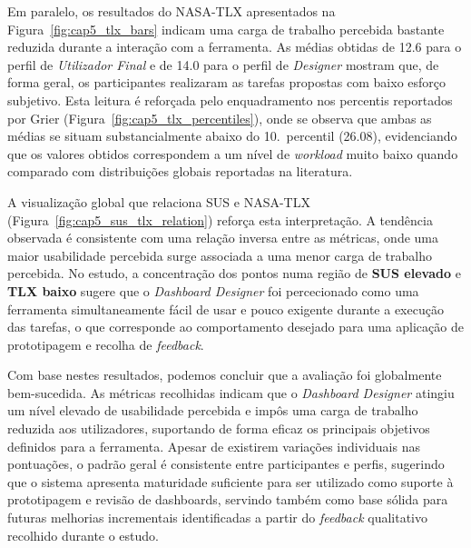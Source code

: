 Em paralelo, os resultados do NASA-TLX apresentados na Figura~\ref{fig:cap5_tlx_bars} indicam uma carga de trabalho percebida bastante reduzida durante a interação com a ferramenta. As médias obtidas de 12.6 para o perfil de \textit{Utilizador Final} e de 14.0 para o perfil de \textit{Designer} mostram que, de forma geral, os participantes realizaram as tarefas propostas com baixo esforço subjetivo. Esta leitura é reforçada pelo enquadramento nos percentis reportados por Grier (Figura~\ref{fig:cap5_tlx_percentiles}), onde se observa que ambas as médias se situam substancialmente abaixo do 10.\ percentil (26.08), evidenciando que os valores obtidos correspondem a um nível de \textit{workload} muito baixo quando comparado com distribuições globais reportadas na literatura. \cite{grier2015high}

A visualização global que relaciona SUS e NASA-TLX (Figura~\ref{fig:cap5_sus_tlx_relation}) reforça esta interpretação. A tendência observada é consistente com uma relação inversa entre as métricas, onde uma maior usabilidade percebida surge associada a uma menor carga de trabalho percebida. No estudo, a concentração dos pontos numa região de \textbf{SUS elevado} e \textbf{TLX baixo} sugere que o \textit{Dashboard Designer} foi percecionado como uma ferramenta simultaneamente fácil de usar e pouco exigente durante a execução das tarefas, o que corresponde ao comportamento desejado para uma aplicação de prototipagem e recolha de \textit{feedback}. \cite{melnick2020perceived}

Com base nestes resultados, podemos concluir que a avaliação foi globalmente bem-sucedida. As métricas recolhidas indicam que o \textit{Dashboard Designer} atingiu um nível elevado de usabilidade percebida e impôs uma carga de trabalho reduzida aos utilizadores, suportando de forma eficaz os principais objetivos definidos para a ferramenta. Apesar de existirem variações individuais nas pontuações, o padrão geral é consistente entre participantes e perfis, sugerindo que o sistema apresenta maturidade suficiente para ser utilizado como suporte à prototipagem e revisão de dashboards, servindo também como base sólida para futuras melhorias incrementais identificadas a partir do \textit{feedback} qualitativo recolhido durante o estudo.